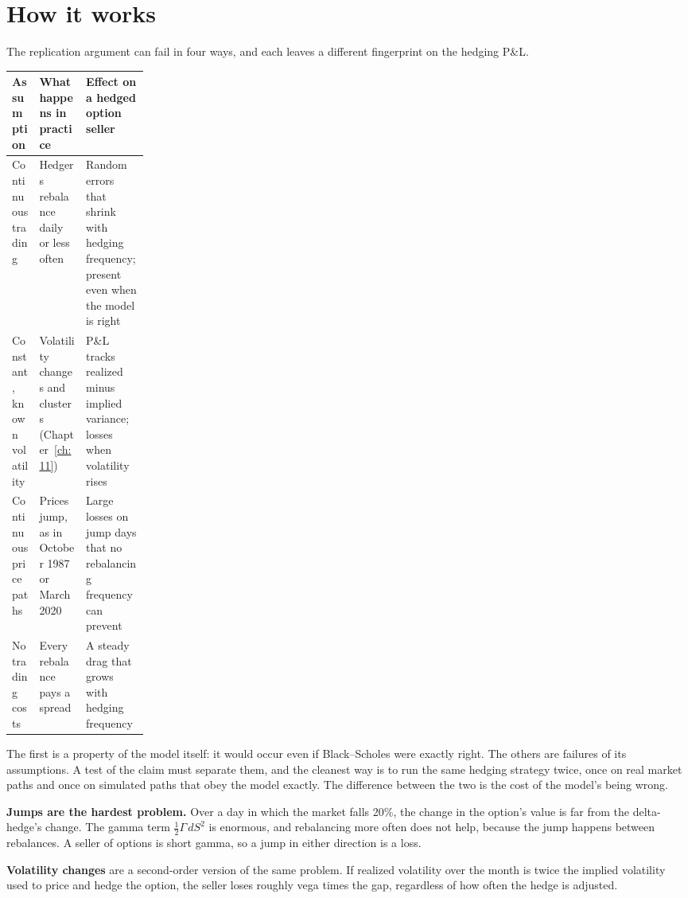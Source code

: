 \section{How it works}
\label{sec:15-how}

The replication argument can fail in four ways, and each leaves a different fingerprint on the hedging P\&L.

\begin{center}
\small
\begin{tabularx}{0.9\linewidth}{@{}>{\raggedright\arraybackslash}p{0.2\linewidth}>{\raggedright\arraybackslash}X>{\raggedright\arraybackslash}X@{}}
\toprule
Assumption & What happens in practice & Effect on a hedged option seller \\
\midrule
Continuous trading & Hedgers rebalance daily or less often & Random errors that shrink with hedging frequency; present even when the model is right \\
Constant, known volatility & Volatility changes and clusters (Chapter~\ref{ch:11}) & P\&L tracks realized minus implied variance; losses when volatility rises \\
Continuous price paths & Prices jump, as in October 1987 or March 2020 & Large losses on jump days that no rebalancing frequency can prevent \\
No trading costs & Every rebalance pays a spread & A steady drag that grows with hedging frequency \\
\bottomrule
\end{tabularx}
\end{center}

The first is a property of the model itself: it would occur even if Black--Scholes were exactly right. The others are failures of its assumptions. A test of the claim must separate them, and the cleanest way is to run the same hedging strategy twice, once on real market paths and once on simulated paths that obey the model exactly. The difference between the two is the cost of the model's being wrong.

\textbf{Jumps are the hardest problem.} Over a day in which the market falls 20\%, the change in the option's value is far from the delta-hedge's change. The gamma term $\tfrac{1}{2}\Gamma\,dS^2$ is enormous, and rebalancing more often does not help, because the jump happens between rebalances. A seller of options is short gamma, so a jump in either direction is a loss.

\textbf{Volatility changes} are a second-order version of the same problem. If realized volatility over the month is twice the implied volatility used to price and hedge the option, the seller loses roughly vega times the gap, regardless of how often the hedge is adjusted.

